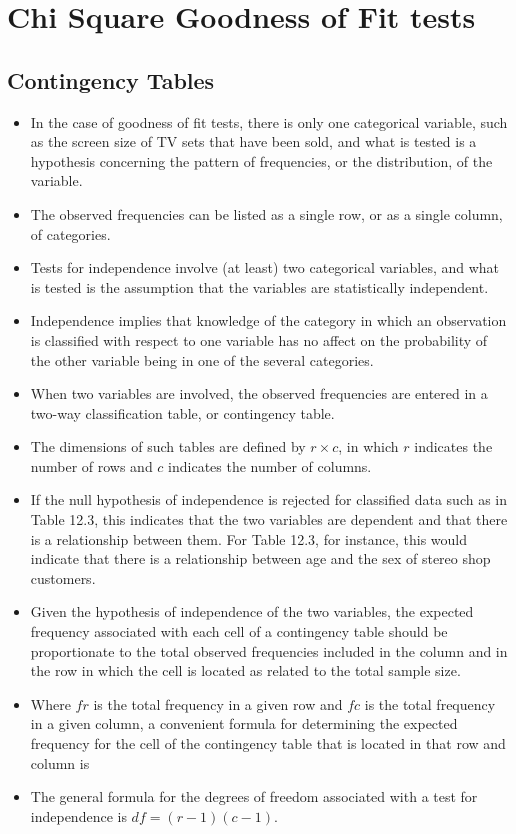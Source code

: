 \documentclass[00-IntroStatsMaster.tex]{subfiles}
\begin{document}
	
\chapter{Chi Square Goodness of Fit tests}
\section{Contingency Tables}
\begin{itemize}
\item In the case of goodness of fit tests, there is only one
categorical variable, such as the screen size of TV sets that have
been sold, and what is tested is a hypothesis concerning the
pattern of frequencies, or the distribution, of the variable.

\item The observed frequencies can be listed as a single row, or as a
single column, of categories.
\item 
Tests for independence involve (at least) two categorical
variables, and what is tested is the assumption that the variables
are statistically independent.
\item 
Independence implies that knowledge of the category in which an
observation is classified with respect to one variable has no
affect on the probability of the other variable being in one of
the several categories.

\item When two variables are involved, the observed frequencies are
entered in a two-way classification table, or contingency table.

\item The dimensions of such tables are defined by $r \times c$, in
which $r$ indicates the number of rows and $c$ indicates the
number of columns.
\item 
If the null hypothesis of independence is rejected for classified
data such as in Table 12.3, this indicates that the two variables
are dependent and that there is a relationship between them. For
Table 12.3, for instance, this would indicate that there is a
relationship between age and the sex of stereo shop customers.

\item Given the hypothesis of independence of the two variables, the
expected frequency associated with each cell of a contingency
table should be proportionate to the total observed frequencies
included in the column and in the row in which the cell is located
as related to the total sample size.

\item Where $fr$ is the total frequency in a given row and $fc$ is the
total frequency in a given column, a convenient formula for
determining the expected frequency for the cell of the contingency
table that is located in that row and column is

\item The general formula for the degrees of freedom associated with a
test for independence is $df = (r - 1)(c - 1)$.

\end{itemize}
\end{document}
